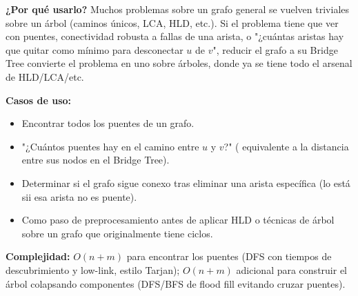 \documentclass[10pt,a4paper,twocolumn]{article}
\begin{document}
\textbf{¿Por qué usarlo?} Muchos problemas sobre un grafo general se
vuelven triviales sobre un árbol (caminos únicos, LCA, HLD, etc.).
Si el problema tiene que ver con puentes, conectividad robusta a
fallas de una arista, o "¿cuántas aristas hay que quitar como mínimo
para desconectar $u$ de $v$", reducir el grafo a su Bridge Tree
convierte el problema en uno sobre árboles, donde ya se tiene todo el
arsenal de HLD/LCA/etc.

\textbf{Casos de uso:}

\begin{itemize}
    \item Encontrar todos los puentes de un grafo.
    \item "¿Cuántos puentes hay en el camino entre $u$ y $v$?" (
    equivalente a la distancia entre sus nodos en el Bridge Tree).
    \item Determinar si el grafo sigue conexo tras eliminar una
    arista específica (lo está sii esa arista no es puente).
    \item Como paso de preprocesamiento antes de aplicar HLD o
    técnicas de árbol sobre un grafo que originalmente tiene ciclos.
\end{itemize}

\textbf{Complejidad:} $O(n + m)$ para encontrar los puentes (DFS con
tiempos de descubrimiento y low-link, estilo Tarjan); $O(n + m)$
adicional para construir el árbol colapsando componentes
(DFS/BFS de flood fill evitando cruzar puentes).
\end{document}
